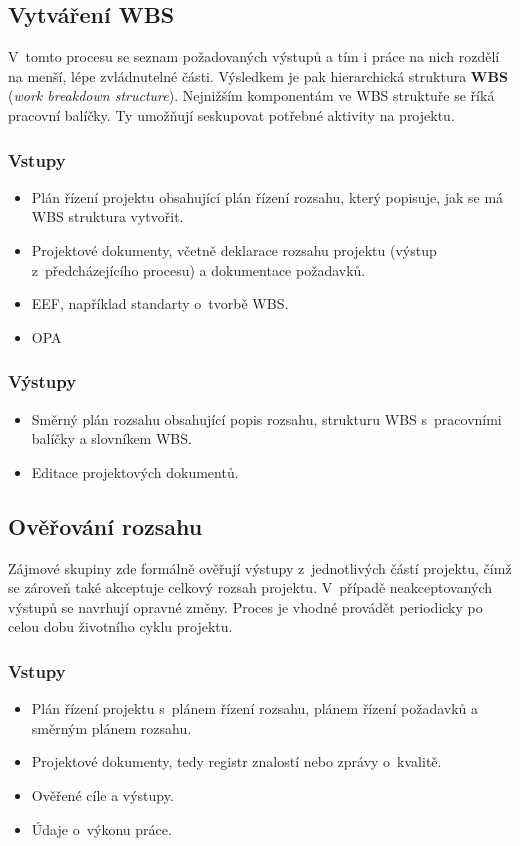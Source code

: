 \subsection*{Vytváření WBS}

V~tomto procesu se seznam požadovaných výstupů a tím i práce na nich rozdělí na menší, lépe zvládnutelné části. Výsledkem je pak hierarchická struktura \textbf{WBS} (\textit{work breakdown structure}). Nejnižším komponentám ve WBS struktuře se říká pracovní balíčky. Ty umožňují seskupovat potřebné aktivity na projektu.

\subsubsection*{Vstupy}
\begin{itemize}
    \item Plán řízení projektu obsahující plán řízení rozsahu, který popisuje, jak se má  WBS struktura vytvořit.
    \item Projektové dokumenty, včetně deklarace rozsahu projektu (výstup z~předcházejícího procesu) a dokumentace požadavků.
    \item EEF, například standarty o~tvorbě WBS.
    \item OPA
\end{itemize}
\subsubsection*{Výstupy}
\begin{itemize}
    \item Směrný plán rozsahu obsahující popis rozsahu, strukturu WBS s~pracovními balíčky a slovníkem WBS. 
    \item Editace projektových dokumentů.
\end{itemize}

\subsection*{Ověřování rozsahu}

Zájmové skupiny zde formálně ověřují výstupy z~jednotlivých částí projektu, čímž se zároveň také akceptuje celkový rozsah projektu. V~případě neakceptovaných výstupů se navrhují opravné změny. Proces je vhodné provádět periodicky po celou dobu životního cyklu projektu. 

\subsubsection*{Vstupy}
\begin{itemize}
    \item Plán řízení projektu s~plánem řízení rozsahu, plánem řízení požadavků a směrným plánem rozsahu.
    \item Projektové dokumenty, tedy registr znalostí nebo zprávy o~kvalitě.
    \item Ověřené cíle a výstupy.
    \item Údaje o~výkonu práce.
\end{itemize}
